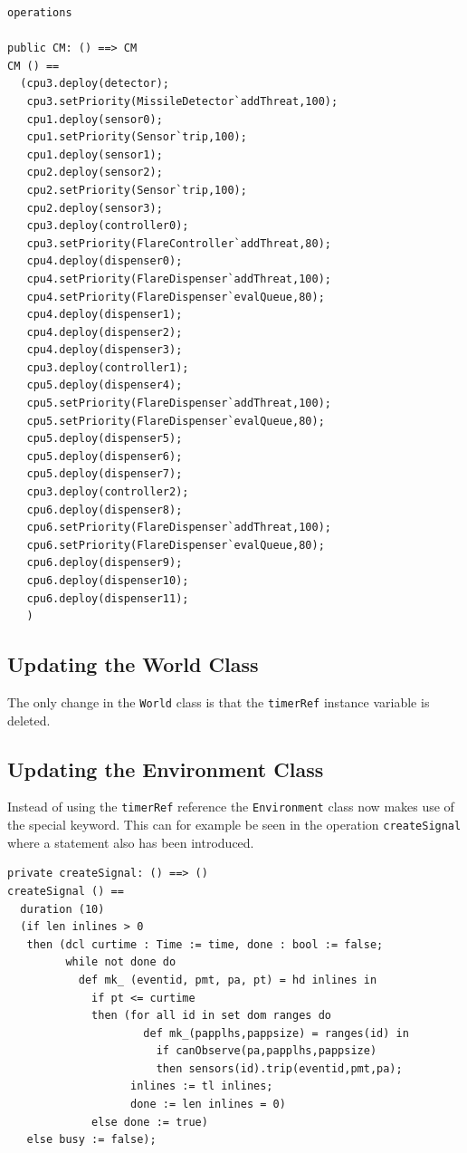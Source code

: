 \documentclass{overturerepchap}
\begin{document}
\begin{lstlisting}
operations

public CM: () ==> CM
CM () ==
  (cpu3.deploy(detector);
   cpu3.setPriority(MissileDetector`addThreat,100);
   cpu1.deploy(sensor0);
   cpu1.setPriority(Sensor`trip,100);
   cpu1.deploy(sensor1);
   cpu2.deploy(sensor2);
   cpu2.setPriority(Sensor`trip,100);
   cpu2.deploy(sensor3);
   cpu3.deploy(controller0);
   cpu3.setPriority(FlareController`addThreat,80);
   cpu4.deploy(dispenser0);
   cpu4.setPriority(FlareDispenser`addThreat,100);
   cpu4.setPriority(FlareDispenser`evalQueue,80);
   cpu4.deploy(dispenser1);
   cpu4.deploy(dispenser2);
   cpu4.deploy(dispenser3);
   cpu3.deploy(controller1);
   cpu5.deploy(dispenser4);
   cpu5.setPriority(FlareDispenser`addThreat,100);
   cpu5.setPriority(FlareDispenser`evalQueue,80);
   cpu5.deploy(dispenser5);
   cpu5.deploy(dispenser6);
   cpu5.deploy(dispenser7);
   cpu3.deploy(controller2);
   cpu6.deploy(dispenser8);
   cpu6.setPriority(FlareDispenser`addThreat,100);
   cpu6.setPriority(FlareDispenser`evalQueue,80);
   cpu6.deploy(dispenser9);
   cpu6.deploy(dispenser10);
   cpu6.deploy(dispenser11);
   )
\end{lstlisting}

\subsection{Updating the World Class}

The only change in the \texttt{World} class is that the \texttt{timerRef}
instance variable is deleted.

\subsection{Updating the Environment Class}

Instead of using the \texttt{timerRef} reference the
\texttt{Environment} class now makes use of the special {\bf{}}
keyword. This can for example be seen in the operation
\texttt{createSignal} where a {\bf{}} statement also has
been introduced.

\begin{lstlisting}
private createSignal: () ==> ()
createSignal () ==
  duration (10) 
  (if len inlines > 0
   then (dcl curtime : Time := time, done : bool := false;
         while not done do
           def mk_ (eventid, pmt, pa, pt) = hd inlines in
             if pt <= curtime
             then (for all id in set dom ranges do
                     def mk_(papplhs,pappsize) = ranges(id) in
                       if canObserve(pa,papplhs,pappsize)
                       then sensors(id).trip(eventid,pmt,pa);
                   inlines := tl inlines;
                   done := len inlines = 0)
             else done := true)
   else busy := false);
\end{lstlisting}
\end{document}
